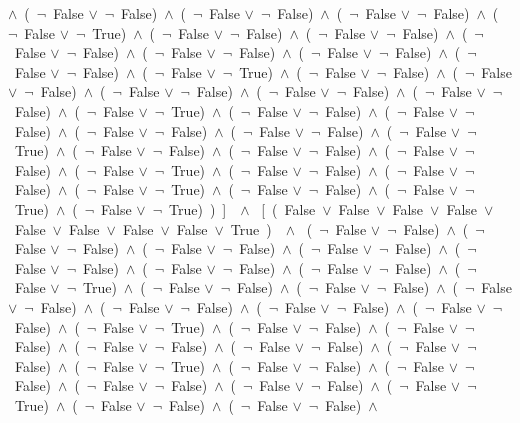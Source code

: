 ﻿\documentclass[a4paper,10pt]{article}
\begin{document}
$\wedge$\ (\  $\neg$\ False $\vee$\  $\neg$\ False)\ $\wedge$\ (\  $\neg$\ False $\vee$\  $\neg$\ False)\ $\wedge$\ (\  $\neg$\ False $\vee$\  $\neg$\ False)\ $\wedge$\ (\  $\neg$\ False $\vee$\  $\neg$\ True)\ $\wedge$\ (\  $\neg$\ False $\vee$\  $\neg$\ False)\ $\wedge$\ (\  $\neg$\ False $\vee$\  $\neg$\ False)\ $\wedge$\ (\  $\neg$\ False $\vee$\  $\neg$\ False)\ $\wedge$\ (\  $\neg$\ False $\vee$\  $\neg$\ False)\ $\wedge$\ (\  $\neg$\ False $\vee$\  $\neg$\ False)\ $\wedge$\ (\  $\neg$\ False $\vee$\  $\neg$\ False)\ $\wedge$\ (\  $\neg$\ False $\vee$\  $\neg$\ True)\ $\wedge$\ (\  $\neg$\ False $\vee$\  $\neg$\ False)\ $\wedge$\ (\  $\neg$\ False $\vee$\  $\neg$\ False)\ $\wedge$\ (\  $\neg$\ False $\vee$\  $\neg$\ False)\ $\wedge$\ (\  $\neg$\ False $\vee$\  $\neg$\ False)\ $\wedge$\ (\  $\neg$\ False $\vee$\  $\neg$\ False)\ $\wedge$\ (\  $\neg$\ False $\vee$\  $\neg$\ True)\ $\wedge$\ (\  $\neg$\ False $\vee$\  $\neg$\ False)\ $\wedge$\ (\  $\neg$\ False $\vee$\  $\neg$\ False)\ $\wedge$\ (\  $\neg$\ False $\vee$\  $\neg$\ False)\ $\wedge$\ (\  $\neg$\ False $\vee$\  $\neg$\ False)\ $\wedge$\ (\  $\neg$\ False $\vee$\  $\neg$\ True)\ $\wedge$\ (\  $\neg$\ False $\vee$\  $\neg$\ False)\ $\wedge$\ (\  $\neg$\ False $\vee$\  $\neg$\ False)\ $\wedge$\ (\  $\neg$\ False $\vee$\  $\neg$\ False)\ $\wedge$\ (\  $\neg$\ False $\vee$\  $\neg$\ True)\ $\wedge$\ (\  $\neg$\ False $\vee$\  $\neg$\ False)\ $\wedge$\ (\  $\neg$\ False $\vee$\  $\neg$\ False)\ $\wedge$\ (\  $\neg$\ False $\vee$\  $\neg$\ True)\ $\wedge$\ (\  $\neg$\ False $\vee$\  $\neg$\ False)\ $\wedge$\ (\  $\neg$\ False $\vee$\  $\neg$\ True)\ $\wedge$\ (\  $\neg$\ False $\vee$\  $\neg$\ True)\ )\ ]\ \ $\wedge$ \ [\ (\ False\ $\vee$\ False\ $\vee$\ False\ $\vee$\ False\ $\vee$\ False\ $\vee$\ False\ $\vee$\ False\ $\vee$\ False\ $\vee$\ True\ )\ \ $\wedge$ \ (\  $\neg$\ False $\vee$\  $\neg$\ False)\ $\wedge$\ (\  $\neg$\ False $\vee$\  $\neg$\ False)\ $\wedge$\ (\  $\neg$\ False $\vee$\  $\neg$\ False)\ $\wedge$\ (\  $\neg$\ False $\vee$\  $\neg$\ False)\ $\wedge$\ (\  $\neg$\ False $\vee$\  $\neg$\ False)\ $\wedge$\ (\  $\neg$\ False $\vee$\  $\neg$\ False)\ $\wedge$\ (\  $\neg$\ False $\vee$\  $\neg$\ False)\ $\wedge$\ (\  $\neg$\ False $\vee$\  $\neg$\ True)\ $\wedge$\ (\  $\neg$\ False $\vee$\  $\neg$\ False)\ $\wedge$\ (\  $\neg$\ False $\vee$\  $\neg$\ False)\ $\wedge$\ (\  $\neg$\ False $\vee$\  $\neg$\ False)\ $\wedge$\ (\  $\neg$\ False $\vee$\  $\neg$\ False)\ $\wedge$\ (\  $\neg$\ False $\vee$\  $\neg$\ False)\ $\wedge$\ (\  $\neg$\ False $\vee$\  $\neg$\ False)\ $\wedge$\ (\  $\neg$\ False $\vee$\  $\neg$\ True)\ $\wedge$\ (\  $\neg$\ False $\vee$\  $\neg$\ False)\ $\wedge$\ (\  $\neg$\ False $\vee$\  $\neg$\ False)\ $\wedge$\ (\  $\neg$\ False $\vee$\  $\neg$\ False)\ $\wedge$\ (\  $\neg$\ False $\vee$\  $\neg$\ False)\ $\wedge$\ (\  $\neg$\ False $\vee$\  $\neg$\ False)\ $\wedge$\ (\  $\neg$\ False $\vee$\  $\neg$\ True)\ $\wedge$\ (\  $\neg$\ False $\vee$\  $\neg$\ False)\ $\wedge$\ (\  $\neg$\ False $\vee$\  $\neg$\ False)\ $\wedge$\ (\  $\neg$\ False $\vee$\  $\neg$\ False)\ $\wedge$\ (\  $\neg$\ False $\vee$\  $\neg$\ False)\ $\wedge$\ (\  $\neg$\ False $\vee$\  $\neg$\ True)\ $\wedge$\ (\  $\neg$\ False $\vee$\  $\neg$\ False)\ $\wedge$\ (\  $\neg$\ False $\vee$\  $\neg$\ False)\ $\wedge$\ 
\end{document}
